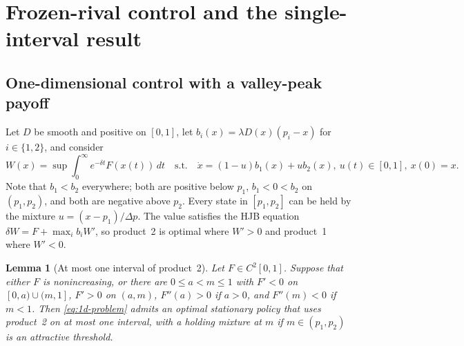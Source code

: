 \documentclass[11pt]{article}
\newtheorem{lemma}{Lemma}
\theoremstyle{definition}
\begin{document}
\section{Frozen-rival control and the single-interval result}\label{app:control}

\subsection{One-dimensional control with a valley-peak payoff}

Let $D$ be smooth and positive on $[0,1]$, let
$b_i(x)=\lambda D(x)(p_i-x)$ for $i\in\{1,2\}$, and consider
\begin{equation}\label{eq:1d-problem}
W(x)=\sup\int_0^\infty e^{-\delta t}F(x(t))\,dt
\quad\text{s.t.}\quad
\dot x=(1-u)b_1(x)+ub_2(x),\ u(t)\in[0,1],\ x(0)=x.
\end{equation}
Note that $b_1<b_2$ everywhere; both are positive below $p_1$, $b_1<0<b_2$
on $(p_1,p_2)$, and both are negative above $p_2$. Every state in
$[p_1,p_2]$ can be held by the mixture $u=(x-p_1)/\Delta p$. The value
satisfies the HJB equation $\delta W=F+\max_i b_iW'$, so product~2 is
optimal where $W'>0$ and product~1 where $W'<0$.

\begin{lemma}[At most one interval of product~2]\label{lem:control}
Let $F\in C^2[0,1]$. Suppose that either $F$ is nonincreasing, or there are
$0\leq a<m\leq1$ with $F'<0$ on $[0,a)\cup(m,1]$, $F'>0$ on $(a,m)$,
$F''(a)>0$ if $a>0$, and $F''(m)<0$ if $m<1$. Then \eqref{eq:1d-problem}
admits an optimal stationary policy that uses product~2 on at most one
interval, with a holding mixture at $m$ if $m\in(p_1,p_2)$ is an attractive
threshold.
\end{lemma}
\end{document}
